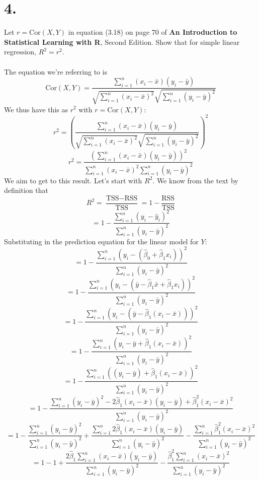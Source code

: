\documentclass{article}
\begin{document}
{\Large 

\section*{4.}
Let \(r = \text{Cor}(X, Y)\) in equation (3.18) on page 70 of \textbf{An Introduction to Statistical Learning with R}, Second Edition. Show that for simple linear regression, \(R^2 = r^2\). \\ \\
The equation we're referring to is 
\[
  \text{Cor}(X, Y) = \frac{\sum_{i=1}^{n} (x_i - \bar{x})(y_i - \bar{y})}{\sqrt{\sum_{i=1}^{n} (x_i - \bar{x})^2} \sqrt{\sum_{i=1}^{n} (y_i - \bar{y})^2}} 
\]
We thus have this as \(r^2\) with \(r = \text{Cor}(X, Y)\):
\[
  r^2 = (\frac{\sum_{i=1}^{n} (x_i - \bar{x})(y_i - \bar{y})}{\sqrt{\sum_{i=1}^{n} (x_i - \bar{x})^2} \sqrt{\sum_{i=1}^{n} (y_i - \bar{y})^2}})^2
\]
\[
  r^2 = \frac{(\sum_{i=1}^{n} (x_i - \bar{x})(y_i - \bar{y}))^2}{\sum_{i=1}^{n} (x_i - \bar{x})^2 \sum_{i=1}^{n} (y_i - \bar{y})^2}
\]
We aim to get to this result. Let's start with \(R^2\). We know from the text by definition that
\[
  R^2 = \frac{\text{TSS} - \text{RSS}}{\text{TSS}} = 1 - \frac{\text{RSS}}{\text{TSS}}
\]
\[
  = 1 - \frac{\sum_{i=1}^{n}(y_i - \hat{y}_i)^2}{\sum_{i=1}^{n} (y_i - \bar{y})^2}
\]
Substituting in the prediction equation for the linear model for \(Y\):
\[
  = 1 - \frac{\sum_{i=1}^{n}(y_i - (\hat{\beta}_0 + \hat{\beta}_1 x_i))^2}{\sum_{i=1}^{n} (y_i - \bar{y})^2}
\]
\[
  = 1 - \frac{\sum_{i=1}^{n}(y_i - (\bar{y} - \hat{\beta}_1 \bar{x} + \hat{\beta}_1 x_i))^2}{\sum_{i=1}^{n} (y_i - \bar{y})^2}
\]
\[
  = 1 - \frac{\sum_{i=1}^{n}(y_i - (\bar{y} - \hat{\beta}_1(x_i - \bar{x})))^2}{\sum_{i=1}^{n} (y_i - \bar{y})^2}
\]
\[
  = 1 - \frac{\sum_{i=1}^{n}(y_i - \bar{y} + \hat{\beta}_1(x_i - \bar{x}))^2}{\sum_{i=1}^{n} (y_i - \bar{y})^2}
\]
\[
  = 1 - \frac{\sum_{i=1}^{n}((y_i - \bar{y}) + \hat{\beta}_1(x_i - \bar{x}))^2}{\sum_{i=1}^{n} (y_i - \bar{y})^2}
\]
\[
  = 1 - \frac{\sum_{i=1}^{n}(y_i - \bar{y})^2 - 2 \hat{\beta}_1(x_i - \bar{x})(y_i - \bar{y}) + \hat{\beta}_1^2 (x_i - \bar{x})^2}{\sum_{i=1}^{n} (y_i - \bar{y})^2}
\]
\[
  = 1 - \frac{\sum_{i=1}^{n} (y_i - \bar{y})^2}{\sum_{i=1}^{n} (y_i - \bar{y})^2} + \frac{\sum_{i=1}^{n} 2 \hat{\beta}_1(x_i - \bar{x})(y_i - \bar{y})}{\sum_{i=1}^{n} (y_i - \bar{y})^2} - \frac{\sum_{i=1}^{n} \hat{\beta}_1^2 (x_i - \bar{x})^2}{\sum_{i=1}^{n} (y_i - \bar{y})^2}
\]
\[
  = 1 - 1 + \frac{2 \hat{\beta}_1 \sum_{i=1}^{n} (x_i - \bar{x})(y_i - \bar{y})}{\sum_{i=1}^{n} (y_i - \bar{y})^2} - \frac{\hat{\beta}_1^2 \sum_{i=1}^{n} (x_i - \bar{x})^2}{\sum_{i=1}^{n} (y_i - \bar{y})^2}
\]}
\end{document}
